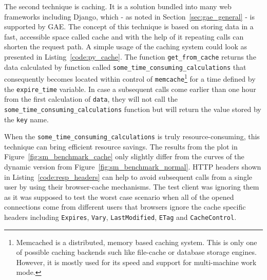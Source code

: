 The second technique is caching. It is a solution bundled into many web frameworks including Django, which - as noted in Section~\ref{sec:gae_general} - is supported by GAE. The concept of this technique is based on storing data in a fast, accessible space called cache and with the help of it repeating calls can shorten the request path. A simple usage of the caching system could look as presented in Listing~\ref{code:py_cache}. The function \texttt{get\_from\_cache} returns the data calculated by function called \texttt{some\_time\_consuming\_calculations} that consequently becomes located within control of \texttt{memcache}\footnote{Memcached is a distributed, memory based caching system. This is only one of possible caching backends such like file-cache or database storage engines. However, it is mostly used for its speed and support for multi-machine work mode.} for a time defined by the \texttt{expire\_time} variable. In case a subsequent calls come earlier than one hour from the first calculation of \texttt{data}, they will not call the \texttt{some\_time\_consuming\_calculations} function but will return the value stored by the \texttt{key} name.       

When the \texttt{some\_time\_consuming\_calculations} is truly resource-consuming, this technique can bring efficient resource savings. The results from the plot in Figure~\ref{fig:sm_benchmark_cache} only slightly differ from the curves of the dynamic version from Figure~\ref{fig:sm_benchmark_normal}. HTTP headers shown in Listing~\ref{code:resp_headers} can help to avoid subsequent calls from a single user by using their browser-cache mechanisms. The test client was ignoring them as it was supposed to test the worst case scenario when all of the opened connections come from different users that browsers ignore the cache specific headers including \texttt{Expires}, \texttt{Vary}, \texttt{Last\-Modified}, \texttt{ETag} and \texttt{Cache\-Control}.

